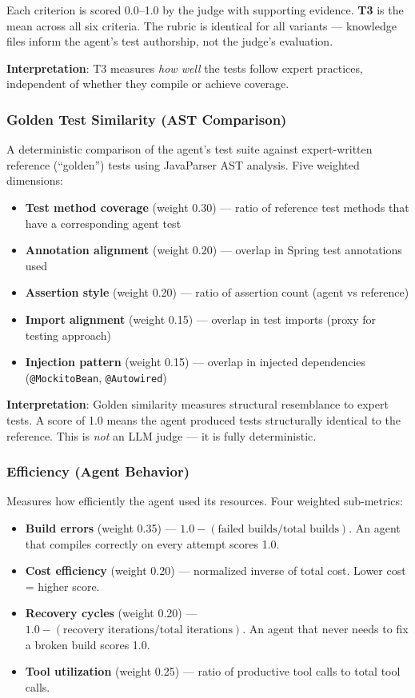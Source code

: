 \documentclass[11pt,a4paper]{article}
\begin{document}
Each criterion is scored 0.0--1.0 by the judge with supporting evidence.
\textbf{T3} is the mean across all six criteria. The rubric is identical for
all variants --- knowledge files inform the agent's test authorship, not the
judge's evaluation.

\textbf{Interpretation}: T3 measures \emph{how well} the tests follow expert
practices, independent of whether they compile or achieve coverage.

\subsubsection{Golden Test Similarity (AST Comparison)}

A deterministic comparison of the agent's test suite against expert-written
reference (``golden'') tests using JavaParser AST analysis. Five weighted
dimensions:

\begin{itemize}
  \item \textbf{Test method coverage} (weight 0.30) --- ratio of reference test methods that have a corresponding agent test
  \item \textbf{Annotation alignment} (weight 0.20) --- overlap in Spring test annotations used
  \item \textbf{Assertion style} (weight 0.20) --- ratio of assertion count (agent vs reference)
  \item \textbf{Import alignment} (weight 0.15) --- overlap in test imports (proxy for testing approach)
  \item \textbf{Injection pattern} (weight 0.15) --- overlap in injected dependencies (\texttt{@MockitoBean}, \texttt{@Autowired})
\end{itemize}

\textbf{Interpretation}: Golden similarity measures structural resemblance to
expert tests. A score of 1.0 means the agent produced tests structurally identical
to the reference. This is \emph{not} an LLM judge --- it is fully deterministic.

\subsubsection{Efficiency (Agent Behavior)}

Measures how efficiently the agent used its resources. Four weighted sub-metrics:

\begin{itemize}
  \item \textbf{Build errors} (weight 0.35) --- $1.0 - (\text{failed builds} / \text{total builds})$. An agent that compiles correctly on every attempt scores 1.0.
  \item \textbf{Cost efficiency} (weight 0.20) --- normalized inverse of total cost. Lower cost = higher score.
  \item \textbf{Recovery cycles} (weight 0.20) --- $1.0 - (\text{recovery iterations} / \text{total iterations})$. An agent that never needs to fix a broken build scores 1.0.
  \item \textbf{Tool utilization} (weight 0.25) --- ratio of productive tool calls to total tool calls.
\end{itemize}
\end{document}
